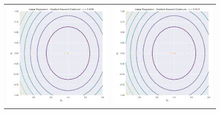 \documentclass[12pt]{article}
\begin{document}
\begin{figure}[!htb]
\begin{tabular}{cc}
\includegraphics[scale=0.3]{linear6.png} & 
\includegraphics[scale=0.3]{linear7.png} \\
\end{tabular}
\end{figure}
\end{document}
